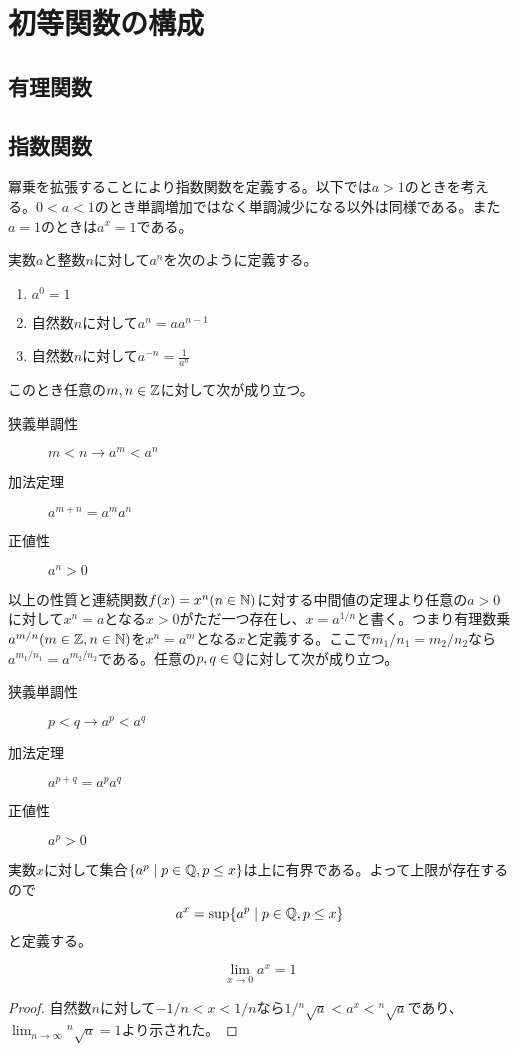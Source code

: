 \section{初等関数の構成}

\subsection{有理関数}
\subsection{指数関数}
	冪乗を拡張することにより指数関数を定義する。以下では$a > 1$のときを考える。$0 < a < 1$のとき単調増加ではなく単調減少になる以外は同様である。また$a = 1$のときは$a^x = 1$である。

	実数$a$と整数$n$に対して$a^n$を次のように定義する。
	\begin{enumerate}
		\item $a^0 = 1$
		\item 自然数$n$に対して$a^n = aa^{n-1}$
		\item 自然数$n$に対して$a^{-n} = \frac{1}{a^n}$
	\end{enumerate}
	このとき任意の$m, n \in \mathbb{Z}$に対して次が成り立つ。
	\begin{description}
		\item[狭義単調性] $m < n \rightarrow a^m < a^n$
		\item[加法定理] $a^{m + n} = a^ma^n$
		\item[正値性] $a^n > 0$
	\end{description}
	以上の性質と連続関数$f(x) = x^n(n \in \mathbb{N})$に対する中間値の定理より任意の$a > 0$に対して$x^n = a$となる$x > 0$がただ一つ存在し、$x = a^{1/n}$と書く。つまり有理数乗$a^{m/n}(m \in \mathbb{Z}, n \in \mathbb{N})$を$x^n = a^m$となる$x$と定義する。ここで$m_1/n_1 = m_2/n_2$なら$a^{m_1/n_1} = a^{m_2/n_2}$である。任意の$p, q \in \mathbb{Q}$に対して次が成り立つ。
	\begin{description}
		\item[狭義単調性] $p < q \rightarrow a^p < a^q$
		\item[加法定理] $a^{p + q} = a^pa^q$
		\item[正値性] $a^p > 0$
	\end{description}
	実数$x$に対して集合$\{a^p \mid p \in \mathbb{Q}, p \leq x\}$は上に有界である。よって上限が存在するので
		\[a^x = \sup\{a^p \mid p \in \mathbb{Q}, p \leq x\}\]
	と定義する。

	\begin{prop}
		\[\lim_{x \to 0} a^x = 1\]
	\end{prop}
	\begin{proof}
		自然数$n$に対して$-1/n < x < 1/n$なら$1/{}^n\sqrt{a} < a^x < {}^n\sqrt{a}$であり、$\lim_{n \to \infty} {}^n\sqrt{a} = 1$より示された。
	\end{proof}

